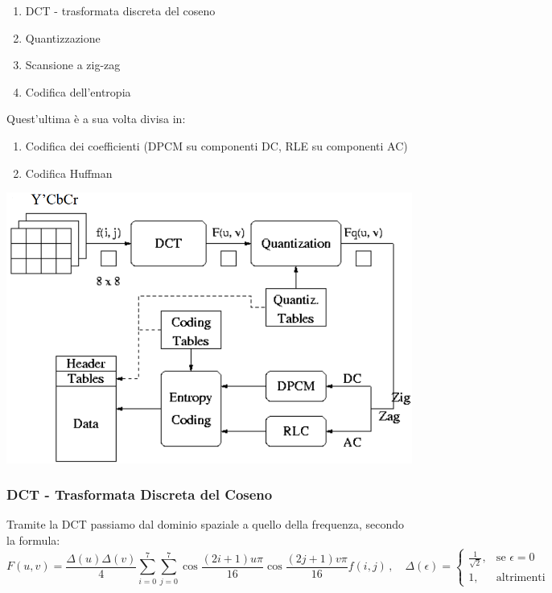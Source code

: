 \documentclass[a4paper,11pt]{article} %
\begin{document}
\begin{minipage}{0.4\textwidth}
\begin{enumerate}
\item DCT - trasformata discreta del coseno
\item Quantizzazione
\item Scansione a zig-zag
\item Codifica dell'entropia
\end{enumerate}
Quest'ultima è a sua volta divisa in:
\begin{enumerate}
\item Codifica dei coefficienti (DPCM su componenti DC, RLE su componenti AC)
\item Codifica Huffman
\end{enumerate}
\end{minipage}
\hspace{0.05\textwidth}
\begin{minipage}{0.55\textwidth}
\centering
    \includegraphics[width=\linewidth]{JPEG chain.png}
\end{minipage}

\subsubsection{DCT - Trasformata Discreta del Coseno}
Tramite la DCT passiamo dal dominio spaziale a quello della frequenza, secondo la formula: 
$$
F(u,v)=\frac{\Delta(u) \Delta(v)}{4} \sum_{i=0}^7 \sum_{j=0}^7 \cos \frac{(2i+1)u \pi}{16} \cos \frac{(2j+1)v \pi}{16} f(i,j)\, , \quad  \Delta(\epsilon)=
\begin{cases}
\frac{1}{\sqrt{2}}, & \text{se } \epsilon = 0 \\
1, & \text{altrimenti}
\end{cases}
$$
\end{document}
